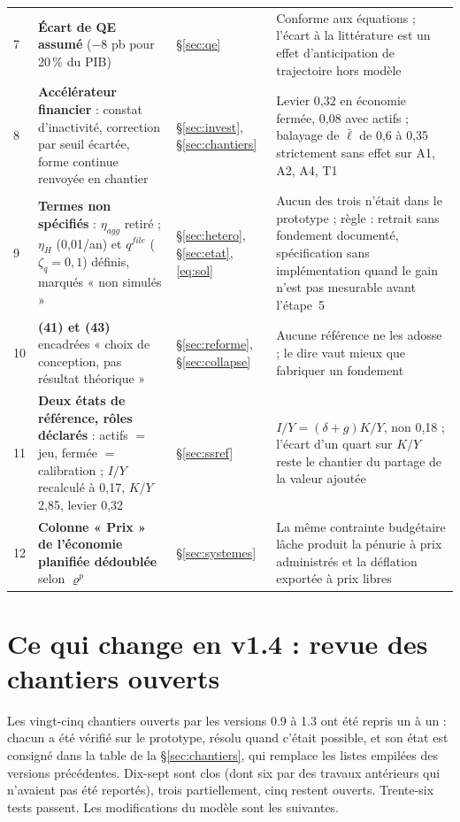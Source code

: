 \documentclass[11pt,a4paper]{article}
\begin{document}
\begin{center}
\begin{longtable}{p{0.5cm}p{6.6cm}p{2.1cm}p{5.8cm}}
7 & \textbf{Écart de QE assumé} ($-8$ pb pour 20\,\% du PIB) & \S\ref{sec:qe} & Conforme aux équations ; l'écart à la littérature est un effet d'anticipation de trajectoire hors modèle\\
8 & \textbf{Accélérateur financier} : constat d'inactivité, correction par seuil écartée, forme continue renvoyée en chantier & \S\ref{sec:invest}, \S\ref{sec:chantiers} & Levier 0,32 en économie fermée, 0,08 avec actifs ; balayage de $\bar\ell$ de 0,6 à 0,35 strictement sans effet sur A1, A2, A4, T1\\
9 & \textbf{Termes non spécifiés} : $\eta_{agg}$ retiré ; $\eta_H$ (0,01/an) et $q^{file}$ ($\zeta_q=0{,}1$) définis, marqués « non simulés » & \S\ref{sec:hetero}, \S\ref{sec:etat}, \eqref{eq:sol} & Aucun des trois n'était dans le prototype ; règle : retrait sans fondement documenté, spécification sans implémentation quand le gain n'est pas mesurable avant l'étape~5\\
10 & \textbf{(41) et (43)} encadrées « choix de conception, pas résultat théorique » & \S\ref{sec:reforme}, \S\ref{sec:collapse} & Aucune référence ne les adosse ; le dire vaut mieux que fabriquer un fondement\\
11 & \textbf{Deux états de référence, rôles déclarés} : actifs $=$ jeu, fermée $=$ calibration ; $I/Y$ recalculé à 0,17, $K/Y$ 2,85, levier 0,32 & \S\ref{sec:ssref} & $I/Y=(\delta+g)K/Y$, non 0,18 ; l'écart d'un quart sur $K/Y$ reste le chantier du partage de la valeur ajoutée\\
12 & \textbf{Colonne « Prix » de l'économie planifiée dédoublée} selon $\varrho^p$ & \S\ref{sec:systemes} & La même contrainte budgétaire lâche produit la pénurie à prix administrés et la déflation exportée à prix libres\\
\bottomrule
\end{longtable}
\end{center}

\section*{Ce qui change en v1.4 : revue des chantiers ouverts}
Les vingt-cinq chantiers ouverts par les versions 0.9 à 1.3 ont été repris un à un : chacun a été vérifié sur le prototype, résolu quand c'était possible, et son état est consigné dans la table de la \S\ref{sec:chantiers}, qui remplace les listes empilées des versions précédentes. Dix-sept sont clos (dont six par des travaux antérieurs qui n'avaient pas été reportés), trois partiellement, cinq restent ouverts. Trente-six tests passent. Les modifications du modèle sont les suivantes.
\end{document}
